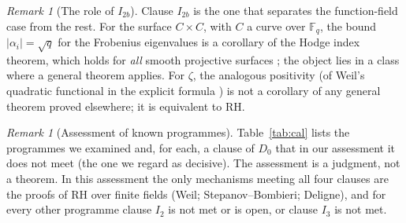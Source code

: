 \documentclass[11pt]{amsart}
\theoremstyle{definition}
\theoremstyle{remark}
\newtheorem{remark}[theorem]{Remark}
\newcommand{\bbF}{\mathbb{F}}
\begin{document}
\begin{remark}[The role of $I_{2b}$]
Clause $I_{2b}$ is the one that separates the function-field case from the
rest. For the surface $C\times C$, with $C$ a curve over $\bbF_q$, the bound
$|\alpha_i|=\sqrt q$ for the Frobenius eigenvalues is a corollary of the Hodge
index theorem, which holds for \emph{all} smooth projective surfaces
\cite{Weil48}; the object lies in a class where a general theorem applies. For
$\zeta$, the analogous positivity (of Weil's quadratic functional in the
explicit formula \cite{Weil52}) is not a corollary of any general theorem
proved elsewhere; it is equivalent to RH.
\end{remark}

\begin{remark}[Assessment of known programmes]\label{prop:cal}
Table~\ref{tab:cal} lists the programmes we examined and, for each, a
clause of $D_0$ that in our assessment it does not meet (the one we regard
as decisive). The assessment is a
judgment, not a theorem. In this assessment the only mechanisms meeting all
four clauses are the proofs of RH over finite fields (Weil;
Stepanov--Bombieri; Deligne), and for every other programme clause $I_2$ is
not met or is open, or clause $I_3$ is not met.
\end{remark}
\end{document}
